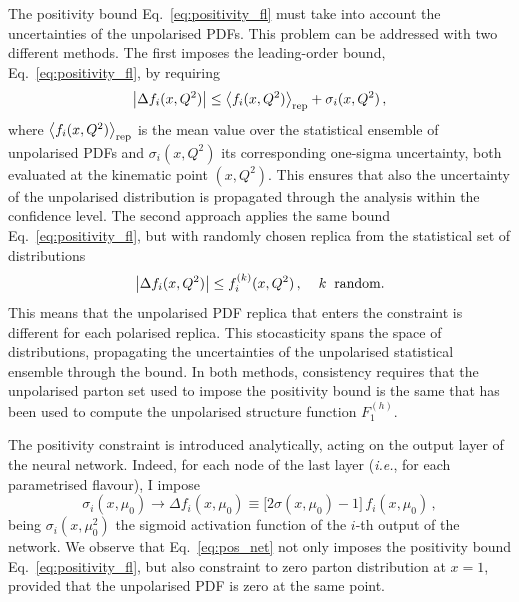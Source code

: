 The positivity bound Eq.~\eqref{eq:positivity_fl} must take into account the uncertainties of the unpolarised PDFs. This problem can be addressed with two different methods. The first imposes the leading-order bound, Eq.~\eqref{eq:positivity_fl}, by requiring
\begin{equation}
  \left| \Delta f_i (x,Q^2) \right| \leq \left<f_i (x,Q^2)\right>_{\textrm{rep}} + \sigma_i(x,Q^2) \,,
  \label{eq:positivity_fl_sigma}
\end{equation}
where $\left<f_i (x,Q^2)\right>_{\textrm{rep}}$ is the mean value over the statistical ensemble of unpolarised PDFs and $\sigma_i(x,Q^2)$ its corresponding one-sigma uncertainty, both evaluated at the kinematic point $(x,Q^2)$. This ensures that also the uncertainty of the unpolarised distribution is propagated through the analysis within the confidence level. The second approach applies the same bound Eq.~\eqref{eq:positivity_fl}, but with randomly chosen replica from the statistical set of distributions
%
\begin{equation}
  \left| \Delta f_i (x,Q^2) \right| \leq f_i^{(k)} (x,Q^2)\,, \hspace{4mm} k \hspace{2mm} \textrm{random}.
  \label{eq:positivity_random}
\end{equation}
This means that the unpolarised PDF replica that enters the constraint is different for each polarised replica. This stocasticity spans the space of distributions, propagating the uncertainties of the unpolarised statistical ensemble through the bound. In both methods, consistency requires that the unpolarised parton set used to impose the positivity bound is the same that has been used to compute the unpolarised structure function $F_1^{(h)}$.%

The positivity constraint is introduced analytically, acting on the output layer of the neural network. Indeed, for each node of the last layer (\textit{i.e.}, for each parametrised flavour), I impose
\begin{equation}
  \sigma_{i} (x,\mu_0) \rightarrow \Delta f_{i} (x, \mu_0) \equiv \bigl[ 2 \sigma(x,\mu_0) - 1 \bigr] \, f_{i} (x,\mu_0) \,,
  \label{eq:pos_net}
\end{equation}
being $\sigma_i(x,\mu^2_0)$ the sigmoid activation function of the $i$-th output of the network. We observe that Eq.~\eqref{eq:pos_net} not only imposes the positivity bound Eq.~\eqref{eq:positivity_fl}, but also constraint to zero parton distribution at $x=1$, provided that the unpolarised PDF is zero at the same point. 

